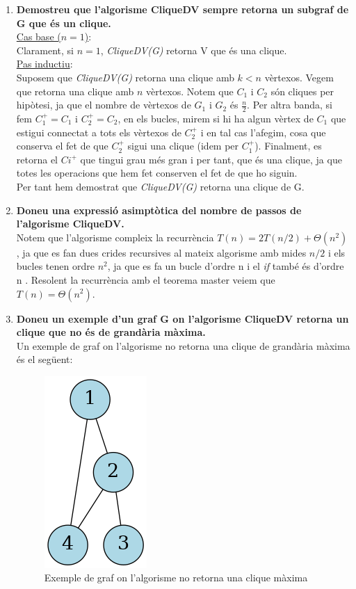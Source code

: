 \documentclass[a4paper,12pt]{article}
\begin{document}
\begin{enumerate}[label=(\alph*)]
    \item \textbf{Demostreu que l'algorisme CliqueDV sempre retorna un subgraf de G que és un clique. \\}
    \underline{Cas base ($n = 1$)}: \\
    Clarament, si $n = 1$, \textit{CliqueDV(G)} retorna V que és una clique.
    \\\underline{Pas inductiu}: \\
    Suposem que \textit{CliqueDV(G)} retorna una clique amb $k<n$ vèrtexos. Vegem que retorna una clique amb $n$ vèrtexos. Notem que $C_1$ i $C_2$ 
    són cliques per hipòtesi, ja que el nombre de vèrtexos de $G_1$ i $G_2$ és $\frac{n}{2}$.
    Per altra banda, si fem $C_1^+ = C_1$ i $C_2^+ = C_2$, en els bucles, mirem si hi ha algun vèrtex de $C_1$ que estigui connectat a tots els vèrtexos
    de $C_2^+$ i en tal cas l'afegim, cosa que conserva el fet de que $C_2^+$ sigui una clique (idem per $C_1^+$). Finalment, es retorna el 
    $Ci^+$ que tingui grau més gran i per tant, que és una clique, ja que totes les operacions que hem fet conserven el fet de que ho siguin. \\

    Per tant hem demostrat que \textit{CliqueDV(G)} retorna una clique de G.


    \item \textbf{Doneu una expressió asimptòtica del nombre de passos de l’algorisme CliqueDV.} \\
    Notem que l'algorisme compleix la recurrència $T(n) = 2T(n/2) + \Theta(n^2)$, ja que es fan dues
    crides recursives al mateix algorisme amb mides $n/2$ i els bucles tenen ordre $n^2$, ja que
    es fa un bucle d'ordre n i el \textit{if} també és d'ordre n . Resolent la recurrència amb el teorema
    master veiem que $T(n) = \Theta(n^2)$. \\

    \item \textbf{Doneu un exemple d'un graf G on l'algorisme CliqueDV retorna un clique que no és de
    grandària màxima.} \\
    Un exemple de graf on l'algorisme no retorna una clique de grandària màxima és el següent: \\

    \begin{figure}[H]
        \centering
        \includegraphics[width=0.2\linewidth]{clique.png}
        \caption{Exemple de graf on l'algorisme no retorna una clique màxima}
        \label{fig:clique}
    \end{figure}




\end{enumerate}
\end{document}
